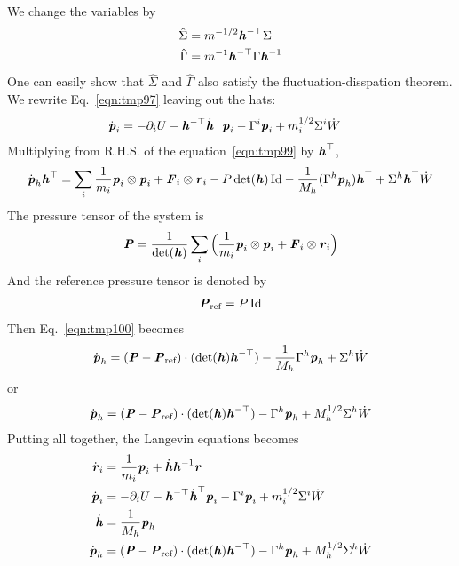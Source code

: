 \documentclass[aps, pre, preprint,unsortedaddress,a4paper,onecolumn]{revtex4}
\newcommand{\vect}[1]{\textbf{\textit{#1}}}
\newcommand{\id}{\mathrm{Id}}
\newcommand{\dvh}{\dot{\vect h}}
\newcommand{\dvr}{\dot{\vect r}}
\newcommand{\dvp}{\dot{\vect p}}
\newcommand{\inv}{{-1}}
\begin{document}
We change the variables by
\begin{align}
  \hat \Sigma &= m^{-1/2} \vect h^{-\top}\Sigma\\
  \hat \Gamma &= m^\inv \vect h^{-\top} \Gamma \vect h^\inv
\end{align}
One can easily show that $\hat \Sigma$ and $\hat \Gamma$ also satisfy the  fluctuation-disspation theorem. We rewrite Eq.~\eqref{eqn:tmp97} leaving out the hats:
\begin{align}
  \dvp_i & = - \partial_i U - \vect h^{-\top}\dvh^\top\vect p_i -   \Gamma^i \vect p_i + m_i^{1/2} \Sigma^i \dot W
\end{align}
Multiplying from R.H.S. of the equation~\eqref{eqn:tmp99} by $\vect h^\top$, 
\begin{align}\label{eqn:tmp100}
  \dot{\vect p}_h \vect h^\top
  = \sum_i\frac{1}{m_i} \vect p_i\otimes\vect p_i + \vect F_i \otimes \vect r_i 
  - P \det (\vect h)\, \id
  - \frac1{M_h} (\Gamma^h \vect p_h) \vect h^\top
  + \Sigma^h \vect h^\top \dot W 
\end{align}
The pressure tensor of the system is
\begin{align}
  \vect P = \frac1{\det(\vect h)} \sum_i \Big( \frac1{m_i}\vect p_i\otimes\vect p_i + \vect F_i\otimes \vect r_i \Big )
\end{align}
And the reference pressure tensor is denoted by
\begin{align}
  \vect P_{\textrm{ref}} = P\,\id
\end{align}
Then Eq.~\eqref{eqn:tmp100} becomes
\begin{align}
  \dot{\vect p}_h 
  =
 (\vect P - \vect P_{\textrm{ref}}) \cdot (\det (\vect h) \vect h^{-\top})
  - \frac1{M_h} \Gamma^h \vect p_h
  + \Sigma^h \dot W   
\end{align}
or
\begin{align}
  \dot{\vect p}_h 
  =
 (\vect P - \vect P_{\textrm{ref}}) \cdot (\det (\vect h) \vect h^{-\top})
  -  \Gamma^h \vect p_h
  + M^{1/2}_h\Sigma^h \dot W   
\end{align}
Putting all together, the Langevin equations becomes
\begin{align}
  \dvr_i &= \frac1{m_i}\vect p_i + \dvh\vect h^\inv\vect r \\
  \dvp_i & = - \partial_i U - \vect h^{-\top}\dvh^\top\vect p_i -   \Gamma^i \vect p_i + m_i^{1/2} \Sigma^i \dot W\\
  \dvh &= \frac1{M_h}{\vect p_h}\\
  \dot{\vect p}_h 
         & =  (\vect P - \vect P_{\textrm{ref}}) \cdot (\det (\vect h) \vect h^{-\top})
           - \Gamma^h \vect p_h
           + M^{1/2}_h\Sigma^h \dot W   
\end{align}


% 
\end{document}
